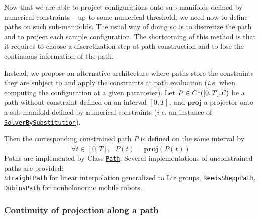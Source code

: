 Now that we are able to project configurations onto sub-manifolds defined by numerical constraints -- up to some numerical threshold, we need now to define paths on such sub-manifolds. The usual way of doing so is to discretize the path and to project each sample configuration. The shortcoming of this method is that it requires to choose a discretization step at path construction and to lose the continuous information of the path.

Instead, we propose an alternative architecture where paths store the constraints they are subject to and apply the constraints at path evaluation {\color{blue}(\textit{i.e.} when computing the configuration at a given parameter)}. Let $P\in C^1([0,T],\mathcal{C})$ be a path without constraint defined on an interval $[0,T]$, and $\mathbf{proj}$ a projector onto a sub-manifold defined by numerical constraints (\textit{i.e.} an instance of\\ \href{https://gepettoweb.laas.fr/hpp/hpp-constraints/doxygen-html/classhpp_1_1constraints_1_1solver_1_1BySubstitution.html}{\texttt{SolverBySubstitution}}).

Then the corresponding constrained path $\tilde{P}$ is defined on the same interval by
$$
\forall t\in[0,T],\ \ \ \tilde{P}(t) = \mathbf{proj}(P(t))
$$
Paths are implemented by Class \href{https://gepettoweb.laas.fr/hpp/hpp-core/doxygen-html/classhpp_1_1core_1_1Path.html}{\texttt{Path}}. Several implementations of unconstrained paths are provided:\\
\href{https://gepettoweb.laas.fr/hpp/hpp-core/doxygen-html/classhpp_1_1core_1_1StraightPath.html}{\texttt{StraightPath}} for linear interpolation generalized to Lie groups, \href{https://gepettoweb.laas.fr/hpp/hpp-core/doxygen-html/classhpp_1_1core_1_1ReedsSheppPath.html}{\texttt{ReedsSheppPath}}, \href{https://gepettoweb.laas.fr/hpp/hpp-core/doxygen-html/classhpp_1_1core_1_1DubinsPath.html}{\texttt{DubinsPath}} for non\-holo\-nomic mobile robots.

\subsubsection{Continuity of projection along a path}

